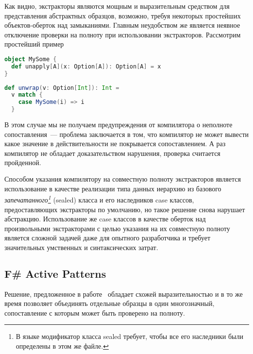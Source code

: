 Как видно, экстракторы \Scala{} являются мощным и выразительным средством для представления абстрактных образцов, возможно, требуя некоторых простейших объектов-оберток над замыканиями. Главным неудобством же является неявное отключение проверки на полноту при использовании экстракторов. Рассмотрим простейший пример

\noindent
\begin{minipage}{\linewidth}
\begin{lstlisting}[language=scala]
object MySome {
  def unapply[A](x: Option[A]): Option[A] = x
}
\end{lstlisting}
\end{minipage}

\noindent
\begin{minipage}{\linewidth}
\begin{lstlisting}[language=scala]
def unwrap(v: Option[Int]): Int = 
  v match {
    case MySome(i) => i
  }
\end{lstlisting}
\end{minipage}

В этом случае мы не получаем предупреждения от компилятора о неполноте сопоставления~--- проблема заключается в том, что компилятор не может вывести какое значение в действительности не покрывается сопоставлением. А раз компилятор не обладает доказательством нарушения, проверка считается пройденной. 

Способом указания компилятору \Scala{} на совместную полноту экстракторов является использование в качестве реализации типа данных иерархию из базового \textit{запечатанного\footnote{В языке \Scala{} модификатор класса sealed требует, чтобы все его наследники были определены в этом же файле.}} (sealed) класса и его наследников case классов, предоставляющих экстракторы по умолчанию, но такое решение снова нарушает абстракцию. Использование же case классов в качестве оберток над произвольными экстракторами с целью указания на их совместную полноту является сложной задачей даже для опытного \Scala{} разработчика и требует значительных умственных и синтаксических затрат. 


\subsection{F\# Active Patterns} \label{sec:active_patterns}
Решение, предложенное в работе~\cite{syme2007extensible} обладает схожей выразительностью и в то же время позволяет объединять отдельные образцы в один многозначный, сопоставление с которым может быть проверено на полноту. 

